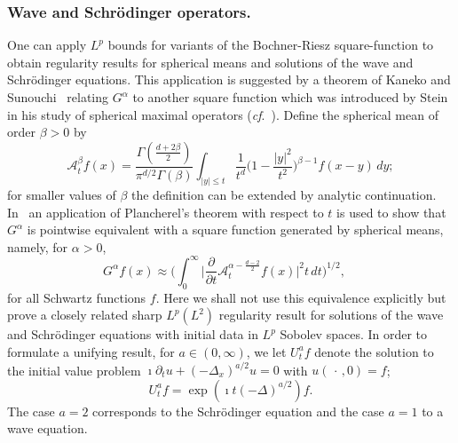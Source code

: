 \documentclass[11pt]{amsart}
\theoremstyle{definition}
\numberwithin{theorem}{section}
\numberwithin{definition}{section}
\def\ecc{\frak e}
\def\im{\imath}
\newcommand{\Be}{\begin{equation}}
\newcommand{\Ee}{\end{equation}}
\newcommand{\note}[1]{\footnote{\texttt{\Small #1}}}
\def\cf{{\it cf}}
\def\bbR{{\mathbb {R}}}
\def\cA{{\mathcal {A}}}
\begin{document}












\subsubsection*{\bf Wave and Schr\"odinger operators.}
One can apply $L^p$ bounds for variants of the Bochner-Riesz square-function
to  obtain regularity results for spherical means
and  solutions of the
wave and Schr\"odinger equations.
This application is suggested  by a theorem of
 Kaneko and Sunouchi~\cite{ks} relating $G^\alpha$ to another
square function which was   introduced by Stein in his study of spherical maximal operators (\cf.~\cite{stsph}).
Define  the spherical mean of order
$\beta>0$
by
$$\cA^\beta_t f(x) = \frac{\Gamma(\frac{d+2\beta}{2})}{\pi^{d/2}\Gamma(\beta)}
\int_{|y|\le t}\frac{1}{t^{d}} \Big(1-\frac{|y|^2}{t^2}\Big)^{\beta-1} f(x-y)\,dy;$$
 for smaller values of $\beta$ the definition can be extended
by analytic
continuation. In~\cite{ks}  an application of Plancherel's theorem with
 respect to $t$  is used to show  that $G^\alpha$ is
pointwise
equivalent with a square function generated by  spherical means, namely, for $\alpha>0$,
$$G^{\alpha} f(x) \approx  \Big(\int_0^\infty \Big| \frac{\partial}{\partial t}
\cA^{\alpha- \frac{d-2}{2}}_t \!f(x)\Big|^2 t\,dt\Big)^{1/2}, \quad
$$
for  all Schwartz functions $f$.
Here we shall  not use this equivalence explicitly but prove a closely
related sharp $L^p(L^2)$ regularity result
for solutions of the wave and Schr\"odinger
 equations with initial data in $L^p$
Sobolev spaces.
In order to formulate a unifying result, for $a\in(0,\infty)$, we let $U_t^af$ denote the solution
to the initial value problem
$\im\partial_tu +(-\Delta_x)^{a/2}u=0$ with  $u(\,\cdot\,,0)=f$;
\Be\label{Ua}
U_t^a f  = \exp (\im t(-\Delta)^{a/2})f.
\Ee
The case $a=2$ corresponds to the Schr\"odinger equation and the
case $a=1$ to a  wave equation.
\end{document}

